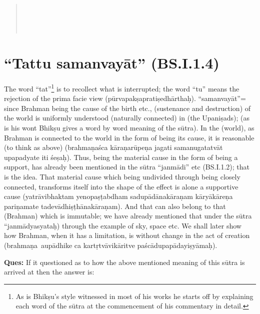 \vskip -2pt

\begin{verse}
\\
\\
\\
\end{verse}

\section*{“Tattu samanvayāt” (BS.I.1.4)}

The word “tat”\footnote{As is Bhikṣu’s style witnessed in most of his works he starts off by explaining each word of the sūtra at the commencement of his commentary in detail.} is to recollect what is interrupted; the word “tu” means the rejection of the prima facie view (pūrvapakṣapratiṣedhā\-rthaḥ). “samanvayāt”= since Brahman being the cause of the birth etc., (sustenance and destruction) of the world is uniformly understood (naturally connected) in (the Upaniṣads); (as is his wont Bhikṣu gives a word by word meaning of the sūtra). In the (world), as Brahman is connected to the world in the form of being its cause, it is reasonable (to think as above) (brahmaṇaśca kāraṇarūpeṇa jagati samanugatatvāt upapadyate iti śeṣaḥ). Thus, being the material cause in the form of being a support, has already been mentioned in the sūtra “janmādi” etc (BS.I.1.2); that is the idea. That material cause which being undivided through being closely connected, transforms itself into the shape of the effect is alone  a supportive cause (yatrāvibhaktam yenopaṣṭabdham sadupādānakāraṇam kāryākāreṇa pariṇamate tadevādhiṣṭhānakāraṇam).  And that can also belong to that (Brahman) which is immutable; we have already mentioned that under the sūtra “janmādyasyataḥ) through the example of sky, space etc. We shall later show how Brahman, when it has a limitation, is without change in the act of creation (brahmaṇa aupādhike ca kartṛtvāvikāritve paścādupapādayiṣyāmaḥ).

\textbf{Ques:} If it questioned as to how the above mentioned meaning of this sūtra is arrived at then the answer is: 

